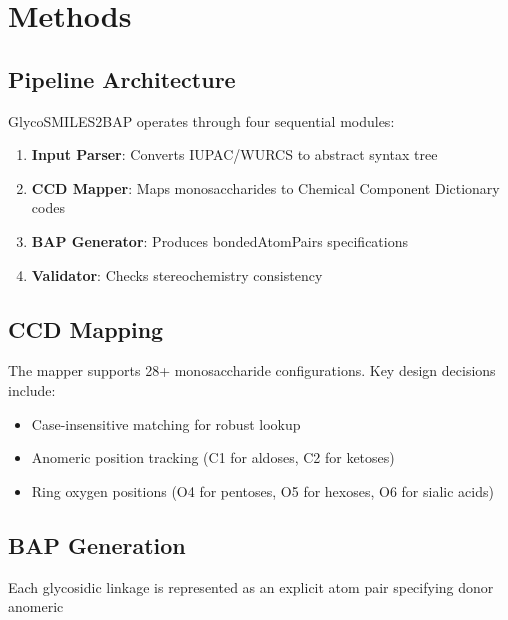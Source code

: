 \documentclass[11pt,a4paper]{article}
\begin{document}
\section{Methods}

\subsection{Pipeline Architecture}

GlycoSMILES2BAP operates through four sequential modules:

\begin{enumerate}
\item \textbf{Input Parser}: Converts IUPAC/WURCS to abstract syntax tree
\item \textbf{CCD Mapper}: Maps monosaccharides to Chemical Component Dictionary codes
\item \textbf{BAP Generator}: Produces bondedAtomPairs specifications
\item \textbf{Validator}: Checks stereochemistry consistency
\end{enumerate}

\subsection{CCD Mapping}

The mapper supports 28+ monosaccharide configurations. Key design decisions include:

\begin{itemize}
\item Case-insensitive matching for robust lookup
\item Anomeric position tracking (C1 for aldoses, C2 for ketoses)
\item Ring oxygen positions (O4 for pentoses, O5 for hexoses, O6 for sialic acids)
\end{itemize}

\subsection{BAP Generation}

Each glycosidic linkage is represented as an explicit atom pair specifying donor anomeric
\end{document}

